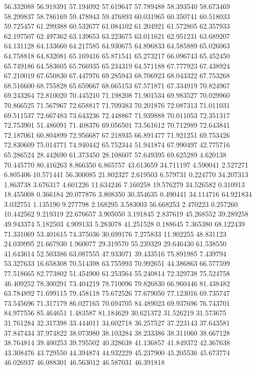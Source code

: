 56.332088
56.918391
57.194092
57.619647
57.789488
58.393540
58.673469
58.299837
58.786169
59.478943
59.476893
60.031965
60.350741
60.518033
59.725457
61.299388
60.532677
61.084102
61.204921
61.572805
62.357933
62.197507
62.497362
63.139653
63.223675
63.011621
62.951231
63.689207
64.131128
64.133660
64.217585
64.930675
64.896833
64.585889
65.026063
64.758818
64.832081
65.169416
65.871541
65.273217
66.096743
65.452450
65.749186
64.583605
65.766935
65.234319
64.571188
67.777923
67.438924
67.210019
67.650830
67.447976
69.285943
68.706923
68.043322
67.753268
68.516600
68.755828
65.659667
68.665153
67.571871
67.334919
70.824967
69.243264
72.810020
70.445210
71.198208
71.901534
69.983527
70.029960
70.866525
71.567967
72.658817
71.709383
70.201876
72.087313
71.011031
69.511537
72.667483
73.643236
72.448867
71.939888
70.011053
72.351317
72.753901
51.486091
71.408376
69.056501
73.561612
70.712989
72.643841
72.187061
60.804899
72.956687
67.218935
66.891477
71.921251
69.753426
72.830609
75.014771
74.940442
65.752344
51.941874
67.990497
42.775716
65.286524
28.442690
61.373450
28.108607
57.649395
69.625289
4.620138
70.445770
80.416263
8.866350
6.865757
43.613659
34.711197
4.590041
2.527271
6.805406
10.571441
56.300085
21.802327
2.619503
6.579731
0.224770
34.207313
1.863738
3.676317
4.601226
11.634246
7.160258
19.576279
34.526582
0.310913
18.455008
0.366184
20.077876
3.808350
30.354635
0.490441
34.114716
64.921834
3.032751
1.135190
9.277798
2.168295
3.583003
56.668253
2.470223
0.257260
10.442562
9.219319
22.676657
3.905050
3.191845
2.837619
45.268552
39.289258
49.943374
5.182503
4.909133
5.283078
41.251528
0.188645
7.365380
68.122439
71.331069
53.401615
74.375036
30.699176
7.275833
11.902255
48.831123
24.039995
21.667930
1.960077
29.319570
55.239329
29.646430
61.538550
41.643614
52.503386
63.087555
47.933071
39.433516
75.891985
7.439794
53.327633
16.658308
70.514398
63.755993
70.992651
44.386863
66.577599
77.518665
82.773802
51.454900
61.253564
55.240814
72.329738
75.524758
46.409252
78.300291
73.404219
78.710096
79.826830
66.960446
81.438482
63.784892
71.699115
79.458118
75.672526
77.679050
77.123016
69.735747
73.545696
71.317179
86.027165
70.694705
84.489023
69.937696
76.743701
84.977556
85.464651
1.483587
81.184629
30.621372
31.526219
31.573675
31.761284
32.317398
33.444011
34.602718
36.257527
37.223143
37.643581
37.847434
37.974822
38.073980
38.103284
38.233386
38.311060
38.667128
38.764814
39.400253
39.795502
40.328638
41.136857
41.849372
42.367638
43.308476
43.729550
44.394874
44.932229
45.237900
45.205536
45.673774
46.026937
46.088301
46.563012
46.587031
46.391818
